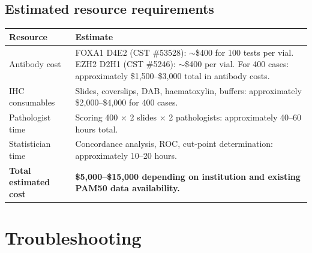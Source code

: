 \documentclass[11pt, a4paper]{article}
\begin{document}
\subsection{Estimated resource requirements}

\begin{center}
\begin{tabular}{p{5cm}p{7.5cm}}
\toprule
\textbf{Resource} & \textbf{Estimate} \\
\midrule
Antibody cost &
FOXA1 D4E2 (CST \#53528): ${\sim}$\$400
for 100 tests per vial. EZH2 D2H1
(CST \#5246): ${\sim}$\$400 per vial.
For 400 cases: approximately \$1,500--\$3,000
total in antibody costs. \\[0.3em]
IHC consumables &
Slides, coverslips, DAB, haematoxylin,
buffers: approximately \$2,000--\$4,000
for 400 cases. \\[0.3em]
Pathologist time &
Scoring 400 $\times$ 2 slides $\times$ 2
pathologists: approximately 40--60 hours
total. \\[0.3em]
Statistician time &
Concordance analysis, ROC, cut-point
determination: approximately 10--20 hours. \\[0.3em]
\textbf{Total estimated cost} &
\textbf{\$5,000--\$15,000 depending on
institution and existing PAM50 data
availability.} \\
\bottomrule
\end{tabular}
\end{center}

\section{Troubleshooting}
\end{document}
